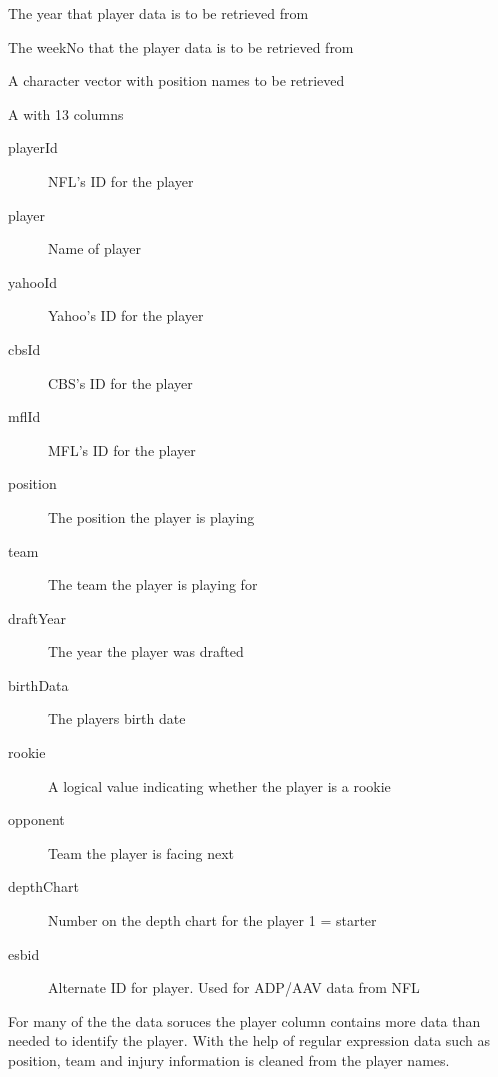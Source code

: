 \documentclass[a4paper]{book}
\begin{document}
%
\begin{Arguments}
\begin{ldescription}
\item[\code{season}] The year that player data is to be retrieved from

\item[\code{weekNo}] The weekNo that the player data is to be retrieved from

\item[\code{pos}] A character vector with position names to be retrieved
\end{ldescription}
\end{Arguments}
%
\begin{Value}
A  with 13 columns
\begin{description}

\item[playerId] NFL's ID for the player
\item[player] Name of player
\item[yahooId] Yahoo's ID for the player
\item[cbsId] CBS's ID for the player
\item[mflId] MFL's ID for the player
\item[position] The position the player is playing
\item[team] The team the player is playing for
\item[draftYear] The year the player was drafted
\item[birthData] The players birth date
\item[rookie] A logical value indicating whether the player is a rookie
\item[opponent] Team the player is facing next
\item[depthChart] Number on the depth chart for the player 1 = starter
\item[esbid] Alternate ID for player. Used for ADP/AAV data from NFL

\end{description}

\end{Value}
%
\begin{Description}\relax
For many of the the data soruces the player column contains more data than
needed to identify the player. With the help of regular expression data such as position,
team and injury information is cleaned from the player names.
\end{Description}
\end{document}
